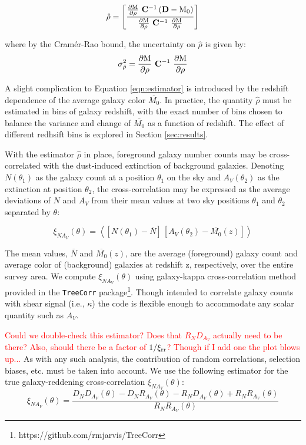 \documentclass[11pt, oneside]{article}   	%
\newcommand{\dMdp}{\rm \frac{\partial M}{\partial \rho}}
\begin{document}
\begin{equation}
\hat{\rho} = \rm \left[ \frac{ \dMdp \ \mathbf{C}^{-1} \left (\mathbf{D} - M_0 \right )} {\dMdp\ \mathbf{C}^{-1 }\ \dMdp} \right ] \label{eqn:estimator}
\end{equation}

where by the Cram\'{e}r-Rao bound, the uncertainty on $\hat{\rho}$ is given by:
\begin{equation}
\sigma^2_{\hat{\rho}} = \rm \dMdp\ \mathbf{C}^{-1 }\ \dMdp \label{eqn:RCO}
\end{equation}

A slight complication to Equation \ref{eqn:estimator} is introduced by the redshift dependence of the average galaxy color $\overline{M_0}$. In practice, the quantity $\hat{\rho}$ must be estimated in bins of galaxy redshift, with the exact number of bins chosen to balance the variance and change of $\overline{M_0}$ as a function of redshift. The effect of different redhsift bins is explored in Section \ref{sec:results}.   

With the estimator $\hat{\rho}$ in place, foreground galaxy number counts may be cross-correlated with the dust-induced extinction of 
background galaxies. Denoting $N(\theta_1)$ as the galaxy count at a position $\theta_1$ on the sky and $A_V(\theta_2)$ as the 
extinction at position $\theta_2$, the cross-correlation may be expressed as the average deviations of 
$N$ and $A_V$ from their mean values at two sky positions $\theta_1$ and $\theta_2$ separated by $\theta$:

\begin{equation}
\xi_{N A_V}(\theta) = \left< [N(\theta_1) - \overline{N}]\,[A_V(\theta_2) - \overline{M_0}(z)] \right> \label{eqn:correl}
\end{equation}

The mean values, $\overline{N}$ and $\overline{M_0}(z)$, are the average (foreground) galaxy count and average color of (background) galaxies at redshift z, respectively, over the entire survey area. We compute $\xi_{N A_V}(\theta)$ using galaxy-kappa cross-correlation method provided in the \texttt{TreeCorr} package\footnote{https://github.com/rmjarvis/TreeCorr}. Though intended to correlate galaxy counts with shear signal (i.e., $\kappa$) the code is flexible enough to accommodate any scalar quantity such as $A_V$.

\textcolor{red}{Could we double-check this estimator? Does that $R_N D_{A_V}$ actually need to be there? Also, should there be a factor of $1/\xi_{\rm rr}$? Though if I add one the plot blows up...}
As with any such analysis, the contribution of random correlations, selection biases, etc. must be taken into account. We use the following estimator for the true galaxy-reddening cross-correlation $\xi_{N A_V}(\theta)$:
\begin{equation}
\xi_{N A_V}(\theta) = \frac{D_N D_{A_V}(\theta) - D_N R_{A_V}(\theta) - R_N D_{A_V}(\theta) + R_N R_{A_V}(\theta)}{R_N R_{A_V}(\theta)}\label{eqn:xi_estimator}
\end{equation}
\end{document}
